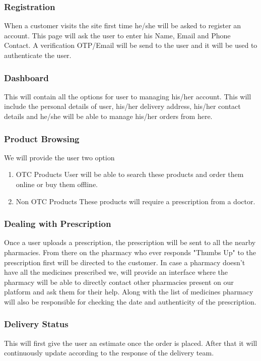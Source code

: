 \documentclass[fleqn,10pt]{../SelfArx} %
\begin{document}
\subsubsection{Registration}

When a customer visits the site first time he/she will be asked to register an account. This page will ask the user to enter his Name, Email and Phone Contact. A verification OTP/Email will be send to the user and it will be used to authenticate the user.
\subsubsection{Dashboard}
This will contain all the options for user to managing his/her account. This will include the personal details of user, his/her delivery address, his/her contact details and he/she will be able to manage his/her orders from here.
\subsubsection{Product Browsing}
We will provide the user two option
\begin{enumerate}
\item {OTC Products}
User will be able to search these products and order them online or buy them offline.
\item {Non OTC Products}
These products will require a prescription from a doctor.
\end{enumerate}

\subsubsection{Dealing with Prescription}
Once a user uploads a prescription, the prescription will be sent to all the nearby pharmacies. From there on the pharmacy who ever responds "Thumbs Up" to the prescription first will be directed to the customer. In case a pharmacy doesn't have all the medicines prescribed we, will provide an interface where the pharmacy will be able to directly contact other pharmacies present on our platform and ask them for their help. Along with the list of medicines pharmacy will also be responsible for checking the date and authenticity of the prescription.
\subsubsection{Delivery Status}
This will first give the user an estimate once the order is placed. After that it will continuously update according to the response of the delivery team.
\end{document}
